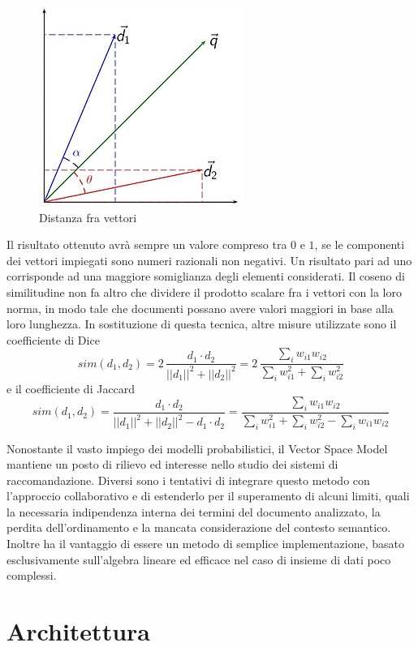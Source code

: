 \documentclass[Lau,binding=0.6cm,noexaminfo,oneside]{sapthesis}
\begin{document}
\begin{figure}[!ht]
  \centering
  \includegraphics[scale=0.9]{vsm.jpg}
  \caption{Distanza fra vettori}
\end{figure}

Il risultato ottenuto avrà sempre un valore compreso tra $0$ e $1$, se le componenti dei vettori impiegati sono numeri razionali non negativi. Un risultato pari ad uno corrisponde ad una maggiore somiglianza degli elementi considerati. Il coseno di similitudine non fa altro che dividere il prodotto scalare fra i vettori con la loro norma, in modo tale che documenti possano avere valori maggiori in base alla loro lunghezza. In sostituzione di questa tecnica, altre misure utilizzate sono il coefficiente di Dice
\[
sim(d_1, d_2) = 2 \, \frac{d_1 \cdot d_2}{||d_1||^2 + ||d_2||^2} = 2 \, \frac{\sum_{i} w_{i1} w_{i2}}{\sum_{i} w_{i1}^2 + \sum_{i} w_{i2}^2}
\]
e il coefficiente di Jaccard
\[
sim(d_1, d_2) = \frac{d_1 \cdot d_2}{||d_1||^2 + ||d_2||^2 - d_1 \cdot d_2} = \frac{\sum_{i} w_{i1} w_{i2}}{\sum_{i} w_{i1}^2 + \sum_{i} w_{i2}^2 - \sum_{i} w_{i1} w_{i2}}
\]

\medskip

Nonostante il vasto impiego dei modelli probabilistici, il Vector Space Model mantiene un posto di rilievo ed interesse nello studio dei sistemi di raccomandazione. Diversi sono i tentativi di integrare questo metodo con l'approccio collaborativo e di estenderlo per il superamento di alcuni limiti, quali la necessaria indipendenza interna dei termini del documento analizzato, la perdita dell'ordinamento e la mancata considerazione del contesto semantico. Inoltre ha il vantaggio di essere un metodo di semplice implementazione, basato esclusivamente sull'algebra lineare ed efficace nel caso di insieme di dati poco complessi.

\chapter{Architettura}
\end{document}
